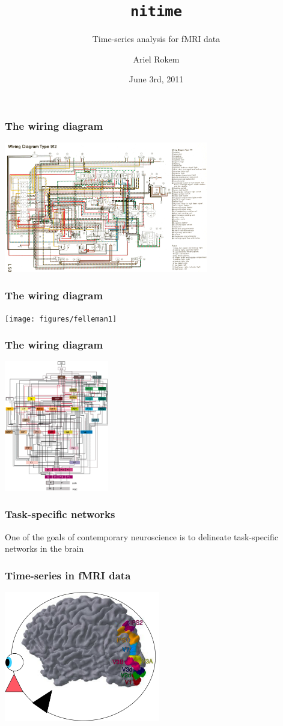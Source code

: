 \documentclass{beamer}
\title[nitime]{\tt{nitime}}
\subtitle
{Time-series analysis for fMRI data}
\author[Ariel Rokem] %
{Ariel Rokem}
\date{June 3rd, 2011}
\institute[University of California, Berkeley]
{University of California, Berkeley}
\begin{document}
\begin{frame}
  \titlepage
\end{frame}

\begin{frame}
\frametitle{The wiring diagram}
\includegraphics[height=5.7cm]{figures/wiring}
\end{frame}

\begin{frame}
\frametitle{The wiring diagram}
\texttt{[image: figures/felleman1]}
\end{frame}

\begin{frame}
\frametitle{The wiring diagram}
\includegraphics[height=5.7cm]{figures/felleman2}
\end{frame}

\begin{frame}
\frametitle{Task-specific networks}
  One of the goals of contemporary neuroscience is to delineate task-specific
  networks in the brain
\end{frame}

\begin{frame}
\frametitle{Time-series in fMRI data}
\includegraphics[height=5.7cm]{figures/brain_w_head}
\end{frame}
\end{document}
